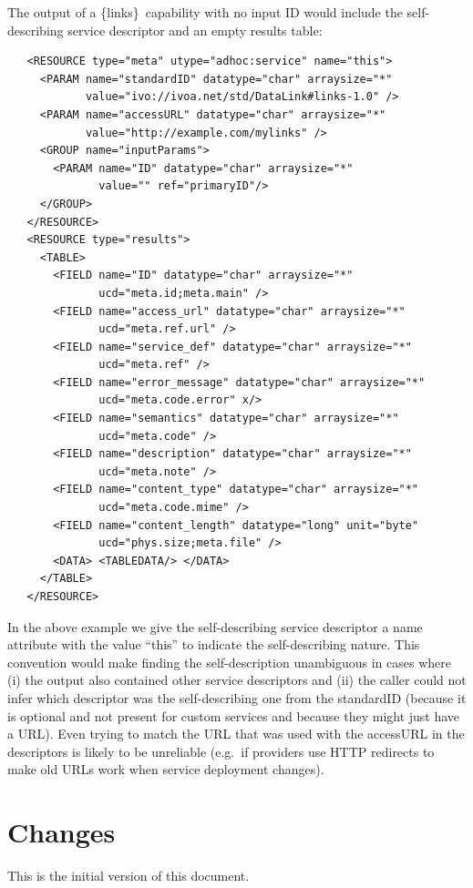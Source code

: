 \documentclass[11pt,a4paper]{ivoa}
\newcommand{\blinks}{\{links\}}
\begin{document}
The output of a \blinks\ capability with no input ID would include the
self-describing service descriptor and an empty results table:
\begin{verbatim}
   <RESOURCE type="meta" utype="adhoc:service" name="this">
     <PARAM name="standardID" datatype="char" arraysize="*"
            value="ivo://ivoa.net/std/DataLink#links-1.0" />
     <PARAM name="accessURL" datatype="char" arraysize="*"
            value="http://example.com/mylinks" />
     <GROUP name="inputParams">
       <PARAM name="ID" datatype="char" arraysize="*"
              value="" ref="primaryID"/>
     </GROUP>
   </RESOURCE>
   <RESOURCE type="results">
     <TABLE>
       <FIELD name="ID" datatype="char" arraysize="*"
              ucd="meta.id;meta.main" />
       <FIELD name="access_url" datatype="char" arraysize="*"
              ucd="meta.ref.url" />
       <FIELD name="service_def" datatype="char" arraysize="*"
              ucd="meta.ref" />
       <FIELD name="error_message" datatype="char" arraysize="*"
              ucd="meta.code.error" x/>
       <FIELD name="semantics" datatype="char" arraysize="*"
              ucd="meta.code" />
       <FIELD name="description" datatype="char" arraysize="*"
              ucd="meta.note" />
       <FIELD name="content_type" datatype="char" arraysize="*"
              ucd="meta.code.mime" />
       <FIELD name="content_length" datatype="long" unit="byte"
              ucd="phys.size;meta.file" />
       <DATA> <TABLEDATA/> </DATA>
     </TABLE>
   </RESOURCE>
\end{verbatim}

In the above example we give the self-describing service descriptor a
name attribute with the value ``this'' to indicate the self-describing
nature. This convention would make finding the self-description
unambiguous in cases where (i) the output also contained other service
descriptors and (ii) the caller could not infer which descriptor was
the self-describing one from the standardID (because it is optional
and not present for custom services and because they might just have a
URL). Even trying to match the URL that was used with the accessURL in
the descriptors is likely to be unreliable (e.g.\ if providers use HTTP
redirects to make old URLs work when service deployment changes).


\section{Changes}

This is the initial version of this document.
\end{document}
